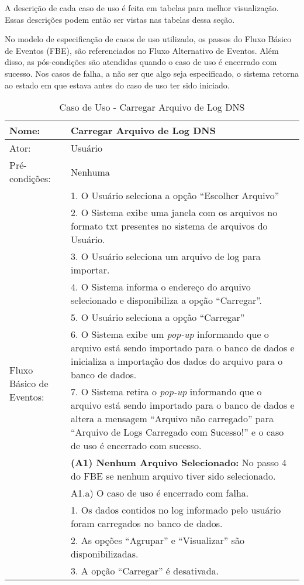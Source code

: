 A descrição de cada caso de uso é feita em tabelas para melhor visualização. Essas descrições podem então ser vistas nas tabelas dessa seção. 

No modelo de especificação de casos de uso utilizado, os passos do Fluxo Básico de Eventos (FBE), são referenciados no Fluxo Alternativo de Eventos. Além disso, as pós-condições são atendidas quando o caso de uso é encerrado com sucesso. Nos casos de falha, a não ser que algo seja especificado, o sistema retorna ao estado em que estava antes do caso de uso ter sido iniciado.

\begin{table}[]
\centering
\caption{Caso de Uso - Carregar Arquivo de Log DNS}
\label{tab:use_case_load_file}
\begin{tabular}{|lp{10cm}|}
\hline
Nome: & Carregar Arquivo de Log DNS  \\ \hline
Ator: & Usuário   \\ \hline
Pré-condições: & Nenhuma   \\ \hline
\multirow{15}{*}{Fluxo Básico de Eventos:} & 1. O Usuário seleciona a opção ``Escolher Arquivo''  \\
 & 2. O Sistema exibe uma janela com os arquivos no formato txt presentes no sistema de arquivos do Usuário.  \\
 & 3. O Usuário seleciona um arquivo de log para importar.  \\
 & 4. O Sistema informa o endereço do arquivo selecionado e disponibiliza a opção ``Carregar''. \\
 & 5. O Usuário seleciona a opção ``Carregar'' \\
 & 6. O Sistema exibe um \textit{pop-up} informando que o arquivo está sendo importado para o banco de dados e inicializa a importação dos dados do arquivo para o banco de dados. \\
 & 7. O Sistema retira o \textit{pop-up} informando que o arquivo está sendo importado para o banco de dados e altera a mensagem ``Arquivo não carregado'' para ``Arquivo de Logs Carregado com Sucesso!'' e o caso de uso é encerrado com sucesso.\\ \hline
\multirow{3}{*}{Fluxo Alternativo de Eventos:} & \textbf{(A1) Nenhum Arquivo Selecionado:} No passo 4 do FBE se nenhum arquivo tiver sido selecionado.\\
 & A1.a) O caso de uso é encerrado com falha.\\ \hline
\multirow{5}{*}{Pós-Condições:} & 1. Os dados contidos no log informado pelo usuário foram carregados no banco de dados. \\
 & 2. As opções ``Agrupar'' e ``Visualizar'' são disponibilizadas.\\
 & 3. A opção ``Carregar'' é desativada.\\
\hline 
\end{tabular}
\end{table}

